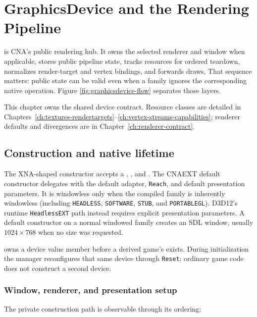 \chapter{GraphicsDevice and the Rendering Pipeline}
\label{ch:graphicsdevice}

 is CNA's public rendering hub. It owns the selected renderer and
window when applicable, stores public pipeline state, tracks resources for ordered teardown,
normalizes render-target and vertex bindings, and forwards draws. That sequence matters: public
state can be valid even when a family ignores the corresponding native operation. Figure
\ref{fig:graphicsdevice-flow} separates those layers.



This chapter owns the shared device contract. Resource classes are detailed in
Chapters~\ref{ch:textures-rendertargets}--\ref{ch:vertex-streams-capabilities}; renderer defaults
and divergences are in Chapter~\ref{ch:renderer-contract}.

\section{Construction and native lifetime}

The XNA-shaped constructor accepts a , , and
. The CNAEXT default constructor delegates with the default
adapter, \texttt{Reach}, and default presentation parameters. It is windowless only when the
compiled family is inherently windowless (including \texttt{HEADLESS}, \texttt{SOFTWARE},
\texttt{STUB}, and \texttt{PORTABLEGL}). D3D12's runtime \texttt{HeadlessEXT} path instead
requires explicit presentation parameters. A default constructor on a normal windowed family
creates an SDL window, usually $1024\times768$ when no size was requested.

 owns a device value member before a derived game's
 exists. During initialization the manager reconfigures that
same device through \texttt{Reset}; ordinary game code does not construct a second device.

\subsection{Window, renderer, and presentation setup}
\label{sec:private-lifecycle}

The private construction path is observable through its ordering:


